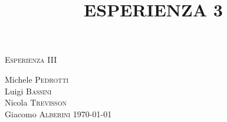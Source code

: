 \documentclass[11pt]{article}
\begin{document}
\begin{center}



\textsc{\Huge Esperienza III}\\[0.5cm]



\large
\title{ESPERIENZA 3}

Michele \textsc{Pedrotti}\\
Luigi \textsc{Bassini}\\
Nicola \textsc{Trevisson}\\
Giacomo \textsc{Alberini}
\today





\end{center}


~\\
\end{document}
